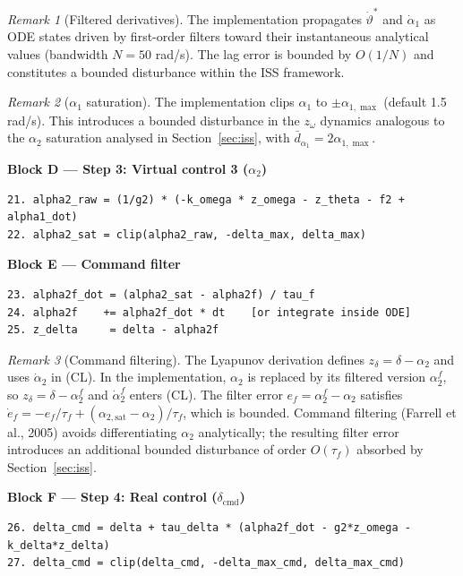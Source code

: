 \documentclass[11pt,a4paper]{article}
\theoremstyle{plain}
\theoremstyle{remark}
\newtheorem{remark}{Remark}[section]
\newcommand{\vths}{\vartheta^*}
\newcommand{\zom}{z_{\omega}}
\newcommand{\zdel}{z_{\delta}}
\newcommand{\dcmd}{\delta_{\mathrm{cmd}}}
\begin{document}
\begin{remark}[Filtered derivatives]
The implementation propagates $\dot\vths$ and $\dot\alpha_1$ as ODE states driven by first-order filters toward their instantaneous analytical values (bandwidth $N = 50$ rad/s). The lag error is bounded by $O(1/N)$ and constitutes a bounded disturbance within the ISS framework.
\end{remark}

\begin{remark}[$\alpha_1$ saturation]
The implementation clips $\alpha_1$ to $\pm\alpha_{1,\max}$ (default 1.5 rad/s). This introduces a bounded disturbance in the $\zom$ dynamics analogous to the $\alpha_2$ saturation analysed in Section~\ref{sec:iss}, with $\bar{d}_{\alpha_1} = 2\alpha_{1,\max}$.
\end{remark}

\textbf{Block D --- Step 3: Virtual control 3 ($\alpha_2$)}

\begin{lstlisting}
21. alpha2_raw = (1/g2) * (-k_omega * z_omega - z_theta - f2 + alpha1_dot)
22. alpha2_sat = clip(alpha2_raw, -delta_max, delta_max)
\end{lstlisting}

\textbf{Block E --- Command filter}

\begin{lstlisting}
23. alpha2f_dot = (alpha2_sat - alpha2f) / tau_f
24. alpha2f    += alpha2f_dot * dt    [or integrate inside ODE]
25. z_delta     = delta - alpha2f
\end{lstlisting}

\begin{remark}[Command filtering]
The Lyapunov derivation defines $\zdel = \delta - \alpha_2$ and uses $\dot\alpha_2$ in (CL). In the implementation, $\alpha_2$ is replaced by its filtered version $\alpha_2^f$, so $\zdel = \delta - \alpha_2^f$ and $\dot\alpha_2^f$ enters (CL). The filter error $e_f = \alpha_2^f - \alpha_2$ satisfies $\dot e_f = -e_f/\tau_f + (\alpha_{2,\mathrm{sat}} - \alpha_2)/\tau_f$, which is bounded. Command filtering (Farrell et al., 2005) avoids differentiating $\alpha_2$ analytically; the resulting filter error introduces an additional bounded disturbance of order $O(\tau_f)$ absorbed by Section~\ref{sec:iss}.
\end{remark}

\textbf{Block F --- Step 4: Real control ($\dcmd$)}

\begin{lstlisting}
26. delta_cmd = delta + tau_delta * (alpha2f_dot - g2*z_omega - k_delta*z_delta)
27. delta_cmd = clip(delta_cmd, -delta_max_cmd, delta_max_cmd)
\end{lstlisting}
\end{document}
